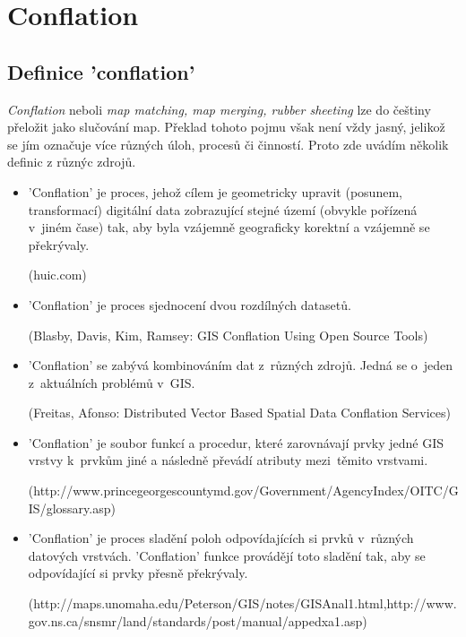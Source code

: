 \chapter{Conflation}
\label{2-conflation}

\section{Definice 'conflation'}

\textit{Conflation} neboli \textit{map matching, map merging, rubber sheeting} lze do češtiny přeložit jako slučování map. Překlad tohoto pojmu však není vždy jasný, jelikož 
se jím označuje více různých úloh, procesů či činností. Proto zde uvádím několik definic z různýc zdrojů.

\begin{itemize}
 \item 'Conflation' je proces, jehož cílem je geometricky upravit (posunem, transformací) digitální data zobrazující stejné území (obvykle pořízená v~jiném čase) tak, aby byla 
    vzájemně geograficky korektní a vzájemně se překrývaly. %
    
    (huic.com)

  \item 'Conflation' je proces sjednocení dvou rozdílných datasetů.
    
    (Blasby, Davis, Kim, Ramsey: GIS Conflation Using Open Source Tools)

  \item 'Conflation' se zabývá kombinováním dat z~různých zdrojů. Jedná se o~jeden z~aktuálních problémů v~GIS.
   
    (Freitas, Afonso: Distributed Vector Based Spatial Data Conflation Services)

  \item 'Conflation' je soubor funkcí a procedur, které zarovnávají prvky jedné GIS vrstvy k~prvkům jiné a následně převádí atributy mezi~těmito vrstvami.
   
    (http://www.princegeorgescountymd.gov/Government/AgencyIndex/\newline OITC/GIS/glossary.asp)

  \item 'Conflation' je proces sladění poloh odpovídajících si prvků v~různých datových vrstvách. 'Conflation' funkce provádějí toto sladění tak, aby se odpovídající si prvky
    přesně překrývaly. 
    
    (http://maps.unomaha.edu/Peterson/GIS/notes/GISAnal1.html,\newline http://www.gov.ns.ca/snsmr/land/standards/post/manual/appedxa1.asp)


\end{itemize}
